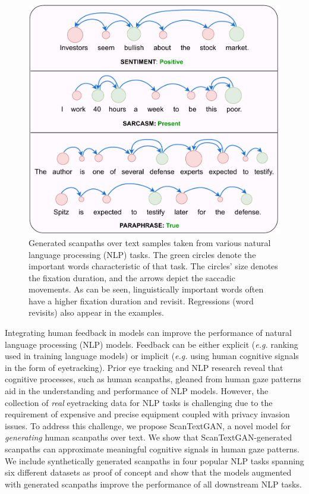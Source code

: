 \begin{figure}[!t]
    \includegraphics[width=1\columnwidth]{images/scanpath_sample_7.pdf}
    \caption{\small Generated scanpaths over text samples taken from various natural language processing (NLP) tasks. The green circles denote the important words characteristic of that task. The circles' size denotes the fixation duration, and the arrows depict the saccadic movements. As can be seen, linguistically important words often have a higher fixation duration and revisit. Regressions (word revisits) also appear in the examples. }
    \label{fig:scanpaths_for_NLP}
\end{figure}

Integrating human feedback in models can improve the performance of natural language processing (NLP) models. Feedback can be either explicit (\textit{e.g.} ranking used in training language models) or implicit (\textit{e.g.} using human cognitive signals in the form of eyetracking). Prior eye tracking and NLP research reveal that cognitive processes, such as human scanpaths, gleaned from human gaze patterns aid in the understanding and performance of NLP models. However, the collection of \textit{real} eyetracking data for NLP tasks is challenging due to the requirement of expensive and precise equipment coupled with privacy invasion issues. To address this challenge, we propose ScanTextGAN, a novel model for \textit{generating} human scanpaths over text. We show that ScanTextGAN-generated scanpaths can approximate meaningful cognitive signals in human gaze patterns. We include synthetically generated scanpaths in four popular NLP tasks spanning six different datasets as proof of concept and show that the models augmented with generated scanpaths improve the performance of all downstream NLP tasks.

